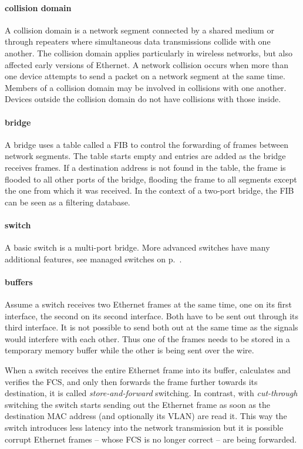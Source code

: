 \paragraph{collision domain}
A collision domain is a network segment connected by a shared medium or through repeaters where simultaneous data transmissions collide with one another.
The collision domain applies particularly in wireless networks, but also affected early versions of Ethernet.
A network collision occurs when more than one device attempts to send a packet on a network segment at the same time.
Members of a collision domain may be involved in collisions with one another.
Devices outside the collision domain do not have collisions with those inside.

\paragraph{bridge}
A bridge uses a table called a \acf{FIB} to control the forwarding of frames between network segments.
The table starts empty and entries are added as the bridge receives frames.
If a destination address is not found in the table, the frame is flooded to all other ports of the bridge, flooding the frame to all segments except the one from which it was received.
In the context of a two-port bridge, the \acl{FIB} can be seen as a filtering database.

\paragraph{switch}
A basic switch is a multi-port bridge.
More advanced switches have many additional features, see managed switches on p.~\pageref{par:ethernet-switch-managed}.

\paragraph{buffers}
Assume a switch receives two Ethernet frames at the same time, one on its first interface, the second on its second interface.
Both have to be sent out through its third interface.
It is not possible to send both out at the same time as the signals would interfere with each other.
Thus one of the frames needs to be stored in a temporary memory buffer while the other is being sent over the wire.


When a switch receives the entire Ethernet frame into its buffer, calculates and verifies the \acs{FCS}, and only then forwards the frame further towards its destination, it is called \emph{store-and-forward} switching.
In contrast, with \emph{cut-through} switching the switch starts sending out the Ethernet frame as soon as the destination \acs{MAC} address (and optionally its \acs{VLAN}) are read it.
This way the switch introduces less latency into the network transmission but it is possible corrupt Ethernet frames -- whose \acs{FCS} is no longer correct -- are being forwarded.

